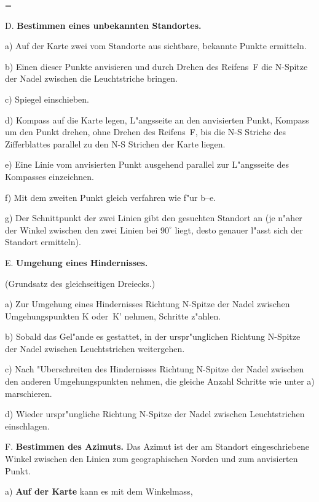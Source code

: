 =\beginpanel\paneldblht
\item{D.} {\bf Bestimmen eines unbekannten Standortes.}
\smallskip
\item{a)} Auf der Karte zwei vom Standorte aus sichtbare,
 be\-kann\-te Punkte ermitteln.
\item{b)} Einen dieser Punkte anvisieren und durch Drehen
 des Reifens~F die N-Spitze der Nadel zwischen die Leucht\-striche bringen.
\item{c)} Spiegel einschieben.
\item{d)} Kompass auf die Karte legen, L"angsseite an den
 anvisier\-ten Punkt, Kompass um den Punkt drehen, ohne Drehen des
 Reifens~F, bis die N-S Striche des Zifferblattes parallel zu den
 N-S Strichen der Karte liegen.
\item{e)} Eine Linie vom anvisierten Punkt ausgehend parallel
 zur L"angsseite des Kompasses einzeichnen.
\item{f)} Mit dem zweiten Punkt gleich verfahren wie f"ur b--e.
\item{g)} Der Schnittpunkt der zwei Linien gibt den gesuchten
 Standort an (je n"aher der Winkel zwischen den zwei Linien bei
 $90^\circ$ liegt, desto genauer l"asst sich der Standort ermitteln).
\bigbreak
\item{E.} {\bf Umgehung eines Hindernisses.}
\item{} (Grundsatz des gleichseitigen Dreiecks.)
\smallskip
\centerline{}
\item{a)} Zur Umgehung eines Hindernisses Richtung N-Spitze der
 Nadel zwischen Umgehungspunkten K oder~K' nehmen, Schritte z"ahlen.
\item{b)} Sobald das Gel"ande es gestattet, in der urspr"unglichen
 Richtung N-Spitze der Nadel zwischen Leuchtstrichen weitergehen.
\item{c)} Nach "Uberschreiten des Hindernisses Richtung N-Spitze
 der Nadel zwischen den anderen Umgehungspunkten nehmen, die gleiche
 Anzahl Schritte wie unter a) mar\-schie\-ren.
\item{d)} Wieder urspr"ungliche Richtung N-Spitze der Nadel
 zwischen Leuchtstrichen einschlagen.
\bigbreak
\item{F.} {\bf Bestimmen des Azimuts.}\hfil\break
 Das Azimut ist der am Standort eingeschriebene Winkel
 zwischen den Linien zum geographischen Norden und zum anvisierten Punkt.
\smallskip
\item{a)} {\bf Auf der Karte} kann es mit dem Winkelmass,
